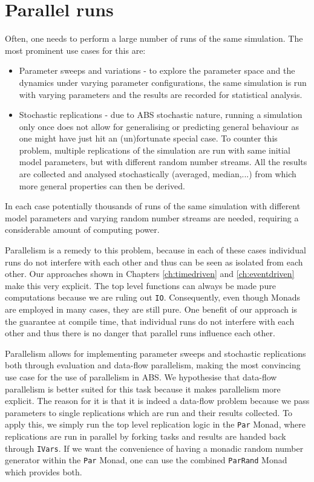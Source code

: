 \section{Parallel runs}
Often, one needs to perform a large number of runs of the same simulation. The most prominent use cases for this are:

\begin{itemize}
	\item Parameter sweeps and variations - to explore the parameter space and the dynamics under varying parameter configurations, the same simulation is run with varying parameters and the results are recorded for statistical analysis.
	
	\item Stochastic replications - due to ABS stochastic nature, running a simulation only once does not allow for generalising or predicting general behaviour as one might have just hit an (un)fortunate special case. To counter this problem, multiple replications of the simulation are run with same initial model parameters, but with different random number streams. All the results are collected and analysed stochastically (averaged, median,...) from which more general properties can then be derived.
\end{itemize}

In each case potentially thousands of runs of the same simulation with different model parameters and varying random number streams are needed, requiring a considerable amount of computing power.

Parallelism is a remedy to this problem, because in each of these cases individual runs do not interfere with each other and thus can be seen as isolated from each other. Our approaches shown in Chapters \ref{ch:timedriven} and \ref{ch:eventdriven} make this very explicit. The top level functions can always be made pure computations because we are ruling out \texttt{IO}. Consequently, even though Monads are employed in many cases, they are still pure. One benefit of our approach is the guarantee at compile time, that individual runs do not interfere with each other and thus there is no danger that parallel runs influence each other. 

Parallelism allows for implementing parameter sweeps and stochastic replications both through evaluation and data-flow parallelism, making the most convincing use case for the use of parallelism in ABS. We hypothesise that data-flow parallelism is better suited for this task because it makes parallelism more explicit. The reason for it is that it is indeed a data-flow problem because we pass parameters to single replications which are run and their results collected. To apply this, we simply run the top level replication logic in the \texttt{Par} Monad, where replications are run in parallel by forking tasks and results are handed back through \texttt{IVars}. If we want the convenience of having a monadic random number generator within the \texttt{Par} Monad, one can use the combined \texttt{ParRand} Monad which provides both.